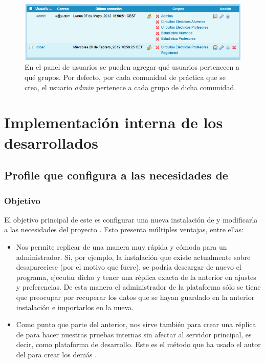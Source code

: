 \begin{figure}
\centering
\includegraphics[width=\linewidth]{../graphics/fig_ejemplo_admin_usuarios.png}
\caption{En el panel de usuarios se pueden agregar qué usuarios pertenecen a qué grupos. Por defecto, por cada comunidad de práctica que se crea, el usuario \textit{admin} pertenece a cada grupo de dicha comunidad.}\label{fig:ejemplo_admin_usuarios}
\end{figure}

\section{Implementación interna de los \profiles{} desarrollados}

\subsection{Profile que configura \tiki{} a las necesidades de \alma{}}

\subsubsection{Objetivo}

El objetivo principal de este \profile{} es configurar una nueva instalación de \tiki{} y modificarla a las necesidades del proyecto \alma{}. Esto presenta múltiples ventajas, entre ellas: 

\begin{itemize}
\item Nos permite replicar \alma{} de una manera muy rápida y cómoda para un administrador. Si, por ejemplo, la instalación que existe actualmente sobre \tiki{} desapareciese (por el motivo que fuere), se podría descargar de nuevo el programa, ejecutar dicho \profile{} y tener una réplica exacta de la anterior \alma{} en ajustes y preferencias. De esta manera el administrador de la plataforma sólo se tiene que preocupar por recuperar los datos que se hayan guardado en la anterior instalación e importarlos en la nueva. 

\item Como punto que parte del anterior, nos sirve también para crear una réplica de \alma{} para hacer nuestras pruebas internas sin afectar al servidor principal, es decir, como plataforma de desarrollo. Este es el método que ha usado el autor del \pfc{} para crear los demás \profiles{}.
\end{itemize}

